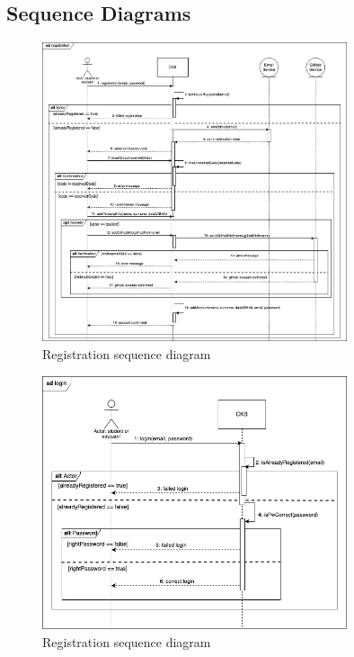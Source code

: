 \subsection{Sequence Diagrams}
\begin{figure}[H]
    \centering
    \includegraphics[width=0.8\textwidth]{images/seq_diagrams/Registration.jpg}
    \caption{Registration sequence diagram}
    \label{fig:sequence_diagram}
\end{figure}
\clearpage

\begin{figure}[H]
    \centering
    \includegraphics[width=0.8\textwidth]{images/seq_diagrams/Login.jpg}
    \caption{Registration sequence diagram}
    \label{fig:sequence_diagram}
\end{figure}
\clearpage

